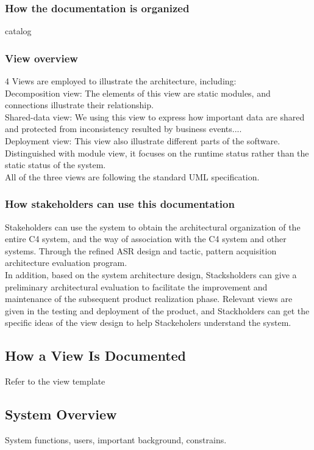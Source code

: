 \documentclass{article}
\begin{document}
	\subsubsection{How the documentation is organized}
	catalog
	\subsubsection{View overview}
	4 Views are employed to illustrate the architecture, including:\\  
	Decomposition view: The elements of this view are static modules, and connections illustrate their relationship.\\  
	Shared-data view: We using this view to express how important data are shared and protected from inconsistency resulted by business events....  \\
	Deployment view: This view also illustrate different parts of the software. Distinguished with module view, it focuses on the runtime status rather than the static status of the system.\\
	All of the three views are following the standard UML specification.
	\subsubsection{How stakeholders can use this documentation}
	Stakeholders can use the system to obtain the architectural organization of the entire C4 system, and the way of association with the C4 system and other systems.
	Through the refined ASR design and tactic, pattern acquisition architecture evaluation program.\\
	In addition, based on the system architecture design, Stacksholders can give a preliminary architectural evaluation to facilitate the improvement and maintenance of the subsequent product realization phase.
	Relevant views are given in the testing and deployment of the product, and Stackholders can get the specific ideas of the view design to help Stackeholers understand the system.\\
	\subsection{How a View Is Documented}
	Refer to the view template

	\subsection{System Overview}
	System functions, users, important background, constrains.
\end{document}
